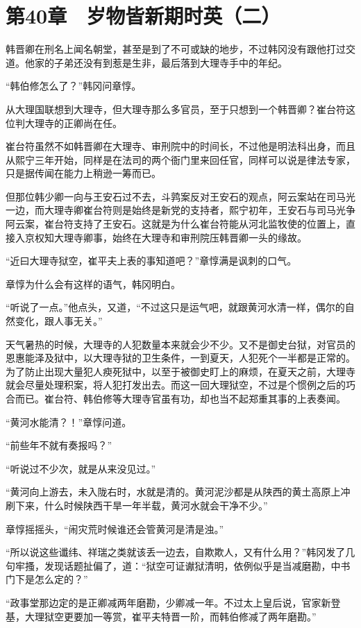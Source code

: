 \section{第40章　岁物皆新期时英（二）}

韩晋卿在刑名上闻名朝堂，甚至是到了不可或缺的地步，不过韩冈没有跟他打过交道。他家的子弟还没有到惹是生非，最后落到大理寺手中的年纪。

“韩伯修怎么了？”韩冈问章惇。

从大理国联想到大理寺，但大理寺那么多官员，至于只想到一个韩晋卿？崔台符这位判大理寺的正卿尚在任。

崔台符虽然不如韩晋卿在大理寺、审刑院中的时间长，不过他是明法科出身，而且从熙宁三年开始，同样是在法司的两个衙门里来回任官，同样可以说是律法专家，只是据传闻在能力上稍逊一筹而已。

但那位韩少卿一向与王安石过不去，斗鹑案反对王安石的观点，阿云案站在司马光一边，而大理寺卿崔台符则是始终是新党的支持者，熙宁初年，王安石与司马光争阿云案，崔台符支持了王安石。这就是为什么崔台符能从河北监牧使的位置上，直接入京权知大理寺卿事，始终在大理寺和审刑院压韩晋卿一头的缘故。

“近曰大理寺狱空，崔平夫上表的事知道吧？”章惇满是讽刺的口气。

章惇为什么会有这样的语气，韩冈明白。

“听说了一点。”他点头，又道，“不过这只是运气吧，就跟黄河水清一样，偶尔的自然变化，跟人事无关。”

天气暑热的时候，大理寺的人犯数量本来就会少不少。又不是御史台狱，对官员的恩惠能泽及狱中，以大理寺狱的卫生条件，一到夏天，人犯死个一半都是正常的。为了防止出现大量犯人瘐死狱中，以至于被御史盯上的麻烦，在夏天之前，大理寺就会尽量处理积案，将人犯打发出去。而这一回大理狱空，不过是个惯例之后的巧合而已。崔台符、韩伯修等大理寺官虽有功，却也当不起郑重其事的上表奏闻。

“黄河水能清？！”章惇问道。

“前些年不就有奏报吗？”

“听说过不少次，就是从来没见过。”

“黄河向上游去，未入陇右时，水就是清的。黄河泥沙都是从陕西的黄土高原上冲刷下来，什么时候陕西干旱一年半载，黄河水就会干净不少。”

章惇摇摇头，“闹灾荒时候谁还会管黄河是清是浊。”

“所以说这些谶纬、祥瑞之类就该丢一边去，自欺欺人，又有什么用？”韩冈发了几句牢搔，发现话题扯偏了，道：“狱空可证谳狱清明，依例似乎是当减磨勘，中书门下是怎么定的？”

“政事堂那边定的是正卿减两年磨勘，少卿减一年。不过太上皇后说，官家新登基，大理狱空更要加一等赏，崔平夫特晋一阶，而韩伯修减了两年磨勘。”

